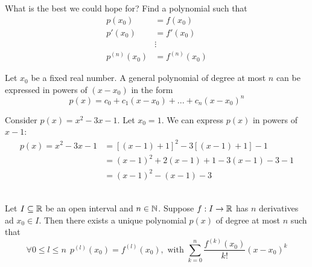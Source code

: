 What is the best we could hope for? Find a polynomial such that
\begin{align*}
    p(x_0) &= f(x_0) \\
    p'(x_0) &= f'(x_0) \\
    &\vdots \\
    p^{(n)}(x_0) &= f^{(n)}(x_0)
\end{align*}

\begin{observation}
    Let $x_0$ be a fixed real number. A general polynomial of degree at most $n$ can be expressed in powers of $(x-x_0)$ in the form
    $$
    p(x) = c_0 + c_1(x-x_0) + ... + c_n(x-x_0)^n
    $$
\end{observation}

\begin{example}
    Consider $p(x) = x^2-3x-1.$ Let $x_0 = 1$. We can express $p(x)$ in powers of $x-1$:
    \begin{align*}
        p(x) = x^2-3x-1 &= \left[(x-1)+1\right]^2-3\left[(x-1)+1\right]-1 \\
        &= (x-1)^2+2(x-1) + 1 -3(x-1) -3 -1 \\
        &= (x-1)^2 -(x-1) - 3
    \end{align*}
\end{example}

\begin{theorem} \leavevmode\\
    Let $I \subseteq \mathbb{R}$ be an open interval and $n\in \mathbb{N}$. Suppose $f:I \to \mathbb{R}$ has $n$ derivatives ad $x_0 \in I.$ Then there exists a unique polynomial $p(x)$ of degree at most $n$ such that 
    $$
    \forall 0 \leq l \leq n ~~p^{(l)}(x_0) = f^{(l)}(x_0), \text{ with } \sum_{k=0}^{n} \frac{f^{(k)}(x_0)}{k!}(x-x_0)^k
    $$
\end{theorem}

